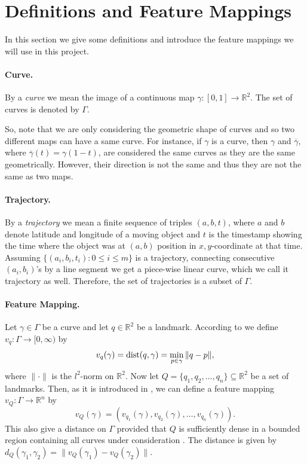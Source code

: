 \documentclass[11pt]{myclass}
\begin{document}


\section{Definitions and Feature Mappings}

In this section we give some definitions and introduce the feature mappings we will use in this project. 

\paragraph{Curve.}
By a {\it curve} we mean the image of a continuous map $\gamma: [0,1] \to \mathbb{R}^2$. The set of curves is denoted by $\Gamma$. 

So, note that we are only considering the geometric shape of curves and so two different maps can have a same curve. For instance, if $\gamma$ is a curve, then $\gamma$ and $\overline{\gamma}$, where $\overline{\gamma}(t) = \gamma(1-t)$, are considered the same curves as they are the same geometrically. However, their direction is not the same and thus they are not the same as two maps. 

\paragraph{Trajectory.}
By a {\it trajectory} we mean a finite sequence of triples $(a, b, t)$, where $a$ and $b$ denote latitude and longitude of a moving object and $t$ is the timestamp showing the time where the object was at $(a, b)$ position in $x, y$-coordinate at that time. Assuming $\{(a_i, b_i, t_i) : 0 \leq i \leq m\}$ is a trajectory, connecting consecutive $(a_i, b_i)$'s by a line segment we get a piece-wise linear curve, which we call it trajectory as well. Therefore, the set of trajectories is a subset of $\Gamma$. 

\paragraph{Feature Mapping.} \label{features}
Let $\gamma \in \Gamma$ be a curve and let $q \in \mathbb{R}^2$ be a landmark. According to \cite{PT19a} we define $v_q: \Gamma \to [0, \infty)$ by 
\[
v_q(\gamma) = {\rm dist}(q, \gamma) = \min_{p \in \gamma} \|q-p\|,
\]
where $\|\cdot\|$ is the $l^2$-norm on $\mathbb{R}^2$. Now let $Q = \{q_1, q_2, \ldots, q_n\} \subseteq \mathbb{R}^2$ be a set of landmarks. Then, as it is introduced in \cite{PT19a}, we can define a feature mapping $v_Q: \Gamma \to \mathbb{R}^n$ by 
\[
v_Q(\gamma) = (v_{q_1}(\gamma), v_{q_2}(\gamma), \ldots, v_{q_n}(\gamma)).
\]
This also give a distance on $\Gamma$ provided that $Q$ is sufficiently dense in a bounded region containing all curves under consideration \cite{PT19a}. The distance is given by $d_Q(\gamma_1, \gamma_2) = \|v_Q(\gamma_1) - v_Q(\gamma_2)\|$.
\end{document}
